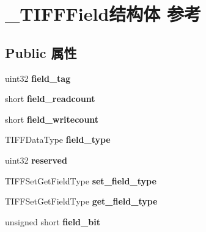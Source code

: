 \hypertarget{struct___t_i_f_f_field}{}\section{\+\_\+\+T\+I\+F\+F\+Field结构体 参考}
\label{struct___t_i_f_f_field}
\subsection*{Public 属性}
\begin{DoxyCompactItemize}
\item 
\mbox{\label{struct___t_i_f_f_field_a0541406646abaf42c173f71a8ad14062}} 
uint32 {\bfseries field\+\_\+tag}
\item 
\mbox{\label{struct___t_i_f_f_field_a9f38c00fc2d01e23053886dea0ff4f45}} 
short {\bfseries field\+\_\+readcount}
\item 
\mbox{\label{struct___t_i_f_f_field_aee32e8c3f48df9788f9eea255a2332b8}} 
short {\bfseries field\+\_\+writecount}
\item 
\mbox{\label{struct___t_i_f_f_field_a1cc4b2707251bfcfd2cd155b92634843}} 
T\+I\+F\+F\+Data\+Type {\bfseries field\+\_\+type}
\item 
\mbox{\label{struct___t_i_f_f_field_ab3ed70fb79ad01bcb59e2a4c757afcd0}} 
uint32 {\bfseries reserved}
\item 
\mbox{\label{struct___t_i_f_f_field_a4745f1891ab613899af058b3661fee18}} 
T\+I\+F\+F\+Set\+Get\+Field\+Type {\bfseries set\+\_\+field\+\_\+type}
\item 
\mbox{\label{struct___t_i_f_f_field_a34c322641577cac5afc5673bb04f99de}} 
T\+I\+F\+F\+Set\+Get\+Field\+Type {\bfseries get\+\_\+field\+\_\+type}
\item 
\mbox{\label{struct___t_i_f_f_field_a508fddea84b792b9a1ef8818ae3b7308}} 
unsigned short {\bfseries field\+\_\+bit}
\item 
\mbox{\label{struct___t_i_f_f_field_a0804e4f28aa889f61b0746696142cfb1}} 

\end{DoxyCompactItemize}

